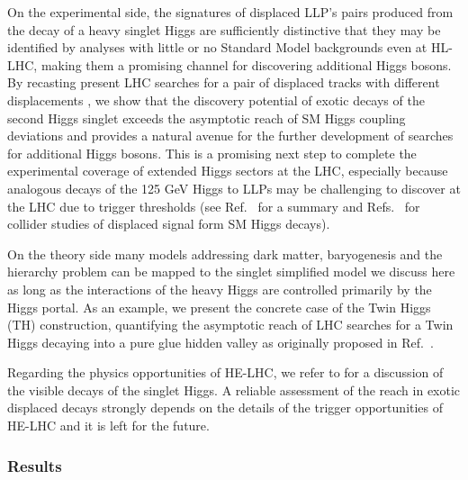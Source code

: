 On the experimental side, the signatures of displaced LLP's pairs produced from the decay of a heavy singlet Higgs are sufficiently distinctive that they may be identified by analyses with little or no Standard Model backgrounds even at HL-LHC, making them a promising channel for discovering additional Higgs bosons. By recasting present LHC searches for a pair of displaced tracks with different displacements \cite{Aad:2015uaa,CMS:2014wda,Aaboud:2018aqj,Sirunyan:2018pwn}, we show that the discovery potential of exotic decays of the second Higgs singlet exceeds the asymptotic reach of SM Higgs coupling deviations and provides a natural avenue for the further development of searches for additional Higgs bosons. This is a promising next step to complete the experimental coverage of extended Higgs sectors at the LHC, especially because analogous decays of the 125 GeV Higgs to LLPs may be challenging to discover at the LHC due to trigger thresholds (see Ref.~\cite{Curtin:2013fra} for a summary and Refs.~\cite{Clarke:2015ala,Csaki:2015fba,Curtin:2015fna,Pierce:2017taw} for collider studies of displaced signal form SM Higgs decays).
  
On the theory side many models addressing dark matter, baryogenesis and the hierarchy problem can be mapped to the singlet simplified model we discuss here as long as the interactions of the heavy Higgs are controlled primarily by the Higgs portal. As an example, we present the concrete case of the Twin Higgs (TH) construction, quantifying the asymptotic reach of LHC searches for a Twin Higgs decaying into a pure glue hidden valley as originally proposed in Ref.~\cite{Craig:2015pha}. 

Regarding the physics opportunities of HE-LHC, we refer to \cite{CidVidal:2018eel} for a discussion of the visible decays of the singlet Higgs. A reliable assessment of the reach in exotic displaced decays strongly depends on the details of the trigger opportunities of HE-LHC and it is left for the future.    

\subsubsection{Results}

